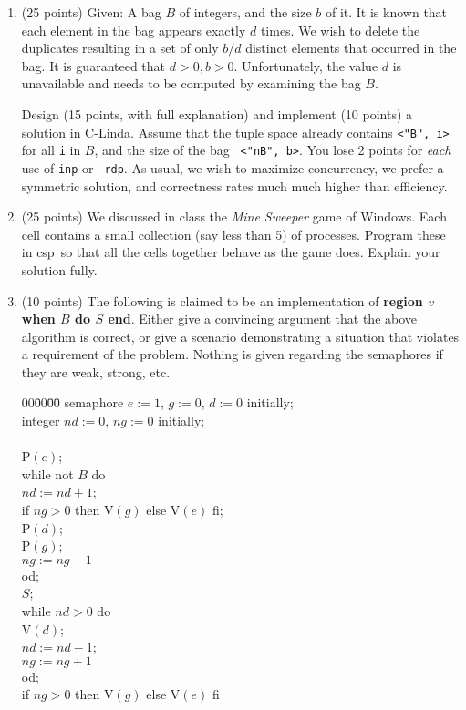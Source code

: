 \documentclass[12pt]{article}
\def\CSP{{\sc csp}}
\begin{document}
\begin{enumerate}
\begin{enumerate}
\end{enumerate}

\item (25 points)
Given: A bag $B$ of integers, and the size $b$ of it.  It is known
that each element in the bag appears exactly $d$ times.  We wish to
delete the duplicates resulting in a set of only $b/d$ distinct
elements that occurred in the bag.  It is guaranteed that $d > 0, b >
0$.  Unfortunately, the value $d$ is unavailable and needs to be
computed by examining the bag $B$.

Design (15 points, with full explanation) and implement (10 points) a
solution in C-Linda.  Assume that the tuple space already contains
{\tt <"B", i>} for all {\tt i} in $B$, and the size of the bag {\tt
<"nB", b>}.  You lose 2 points for {\sl each} use of {\tt inp} or {\tt
rdp}.  As usual, we wish to maximize concurrency, we prefer a
symmetric solution, and correctness rates much much higher than
efficiency.

\item (25 points)
We discussed in class the {\em Mine Sweeper} game of Windows.  Each
cell contains a small collection (say less than 5) of processes.  Program these
in \CSP\ so that  all the cells together behave as the game does.
Explain your solution fully.


\item (10 points) The following is claimed to be an implementation of
{\bf region $v$ when $B$ do $S$ end}.  Either give a convincing
argument that the above algorithm is correct, or give a scenario
demonstrating a situation that violates a requirement of the problem.
Nothing is given regarding the semaphores if they are weak, strong,
etc.

{\bf
\begin{tabbing}
00\=00\=00\=\kill
semaphore $e := 1$, $g := 0$, $d := 0$ initially;\\
integer $nd := 0$, $ng := 0$ initially;\\
\\
P$(e)$;\\
while not $B$ do\+\\
  $nd := nd + 1$;\\
  if $ng > 0$ then V$(g)$ else V$(e)$ fi;\\
  P$(d)$;\\
  P$(g)$;\\
  $ng := ng - 1$\-\\
od;\\
$S$;\\
while $nd > 0$ do\+\\
  V$(d)$;\\
  $nd := nd - 1$;\\
  $ng := ng + 1$\-\\
od;\\
if $ng > 0$ then V$(g)$ else V$(e)$ fi
\end{tabbing}
}


\end{enumerate}
\end{document}
